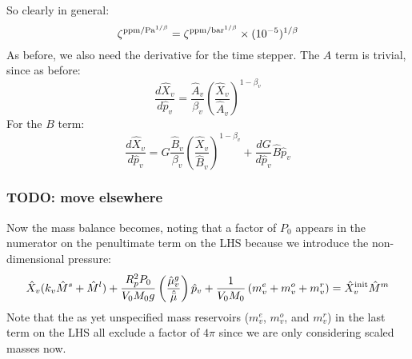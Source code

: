 So clearly in general:
\begin{equation}
\zeta^{{\rm ppm/Pa}^{1/\beta}} = \zeta^{{\rm ppm/bar}^{1/\beta}} \times (10^{-5})^{1/\beta}
\end{equation}
As before, we also need the derivative for the time stepper.  The $A$ term is trivial, since as before:
\begin{equation}
\frac{d \hat{X}_v}{d \hat{p}_v} = \frac{\hat{A}_v}{\beta_v} \left(\frac{\hat{X}_v}{\hat{A}_v}\right)^{1-\beta_v}
\end{equation}
For the $B$ term:
\begin{equation}
\frac{d \hat{X}_v}{d \hat{p}_v} = G \frac{\hat{B}_v}{\beta_v} \left(\frac{\hat{X}_v}{\hat{B}_v}\right)^{1-\beta_v} + \frac{dG}{d \hat{p}_v} \hat{B} \hat{p}_v
\end{equation}


\begin{comment}
Introduce dimensional scalings and associate fugacities with partial pressure (ideal gas approximation):
\begin{equation}
V_0 \hat{X}_v = AP_0^{1/2} {p_{H_2O}}^\frac{1}{2}+B G P_0 p_{H_2O}
\end{equation}
Rearranging:
\begin{equation}
\hat{X}_v = \frac{A P_0^{1/2}}{V_0} {p_{H_2O}}^\frac{1}{2}+ \frac{B P_0}{V_0} G p_{H_2O}
\end{equation}
Therefore:
\begin{equation}
\hat{A} = \frac{A P_0^{1/2}}{V_0}, \qquad \hat{B} = \frac{B P_0}{V_0}
\end{equation}
We can generalise the scaling if we introduce some arbitrary pressure exponent, so we can account for both the $A$ and $B$ coefficients:
\begin{equation}
\hat{\zeta} = \frac{\zeta P_0^\beta}{V_0}
\end{equation}
This is comparable to the scaling for the non-dimensional Henry constant $\alpha$ calculated above.  Rearranging:
\begin{equation}
\zeta = \frac{\hat{\zeta} V_0}{P_0^\beta}
\end{equation}
In the code, we input $\zeta$ in units of ppm/Pa$^\beta$ to keep with convention.  
\end{comment}


\subsubsection{TODO: move elsewhere}
Now the mass balance becomes, noting that a factor of $P_0$ appears in the numerator on the penultimate term on the LHS because we introduce the non-dimensional pressure:
\begin{equation}
\hat{X}_v (k_v \hat{M}^s + \hat{M}^l) + \frac{R_p^2 P_0}{V_0 M_0 g} \left( \frac{\hat{\mu}_v^g}{\hat{\bar{\mu}}} \right) \hat{p}_v + \frac{1}{V_0 M_0} \left( m_v^e + m_v^o + m_v^r \right) = \hat{X}_v^{\rm init} \hat{M}^m
\end{equation}
Note that the as yet unspecified mass reservoirs ($m_v^e$, $m_v^o$, and $m_v^r$) in the last term on the LHS all exclude a factor of $4\pi$ since we are only considering scaled masses now.


